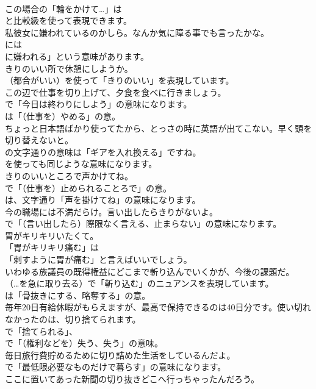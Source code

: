 \documentclass[8pt]{extreport}
\begin{document}
\begin{CJK}{UTF8}{min}
\\	この場合の「輪をかけて…」は
\\	と比較級を使って表現できます。	
\\	私彼女に嫌われているのかしら。なんか気に障る事でも言ったかな。 
\\	には
\\	に嫌われる」という意味があります。	
\\	きりのいい所で休憩にしようか。 
\\	（都合がいい）を使って「きりのいい」を表現しています。	
\\	この辺で仕事を切り上げて、夕食を食べに行きましょう。 
\\	で「今日は終わりにしよう」の意味になります。
\\	は「（仕事を）やめる」の意。	
\\	ちょっと日本語ばかり使ってたから、とっさの時に英語が出てこない。早く頭を切り替えないと。 
\\	の文字通りの意味は「ギアを入れ換える」ですね。
\\	を使っても同じような意味になります。	
\\	きりのいいところで声かけてね。 
\\	で「（仕事を）止められることろで」の意。
\\	は、文字通り「声を掛けてね」の意味になります。	
\\	今の職場には不満だらけ。言い出したらきりがないよ。 
\\	で「（言い出したら）際限なく言える、止まらない」の意味になります。	
\\	胃がキリキリいたくて。 
\\	「胃がキリキリ痛む」は
\\	「刺すように胃が痛む」と言えばいいでしょう。	
\\	いわゆる族議員の既得権益にどこまで斬り込んでいくかが、今後の課題だ。 
\\	（…を急に取り去る）で「斬り込む」のニュアンスを表現しています。
\\	は「骨抜きにする、略奪する」の意。	
\\	毎年20日有給休暇がもらえますが、最高で保持できるのは40日分です。使い切れなかったのは、切り捨てられます。 
\\	で「捨てられる」、
\\	で「（権利などを）失う、失う」の意味。	
\\	毎日旅行費貯めるために切り詰めた生活をしているんだよ。 
\\	で「最低限必要なものだけで暮らす」の意味になります。	
\\	ここに置いてあった新聞の切り抜きどこへ行っちゃったんだろう。 

\end{CJK}
\end{document}
